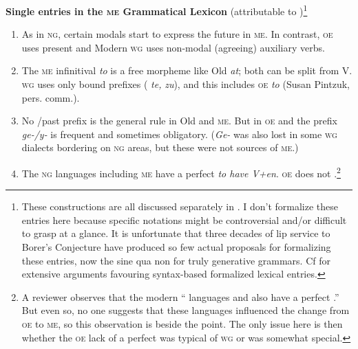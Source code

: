 \documentclass[output=paper]{LSP/langsci}
\begin{document}
\ea \label{ex:emonds:2}%
     

      \textbf{Single entries in the \textsc{me} Grammatical Lexicon} (attributable to )\footnote{These constructions are all discussed separately in \citet[Chs 3-6]{EmondsFaarlund2014}. I don’t formalize these entries here because specific notations might be controversial and/or difficult to grasp at a glance. It is unfortunate that three decades of lip service to Borer’s Conjecture have produced so few actual proposals for formalizing these entries, now the sine qua non for truly generative grammars. Cf \citet{Emonds2000} for extensive arguments favouring syntax-based formalized lexical entries.} 

    \z

\begin{enumerate}[label={(\alph*)}]
\item As in \textsc{ng}, certain modals start to express the future  in \textsc{me}. In contrast, \textsc{oe} uses present  and Modern \textsc{wg} uses non-modal (agreeing) auxiliary verbs. 
\item The \textsc{me} infinitival \textit{to} is a free morpheme like Old  \textit{at}; both can be split from V. \textsc{wg}  uses only bound prefixes ( \textit{te,}  \textit{zu}), and this includes \textsc{oe} \textit{to} (Susan Pintzuk, pers. comm.). 
\item No /past  prefix is the general rule in Old  and \textsc{me}. But in \textsc{oe} and  the prefix \textit{ge-/y-} is frequent and sometimes obligatory. (\textit{Ge-} was also lost in some \textsc{wg} dialects bordering on \textsc{ng} areas, but these were not sources of \textsc{me}.)
\item The \textsc{ng} languages including \textsc{me} have a perfect  \textit{to have V+en}. \textsc{oe} does not \citep[336--337]{Fischer1992}.\footnote{A reviewer observes that the modern `` languages  and  also have a perfect .'' But even so, no one suggests that these languages influenced the change from \textsc{oe} to \textsc{me}, so this observation is beside the point. The only issue here is then whether the \textsc{oe} lack of a perfect  was typical of \textsc{wg} or was somewhat special.}

\end{enumerate}
\end{document}
